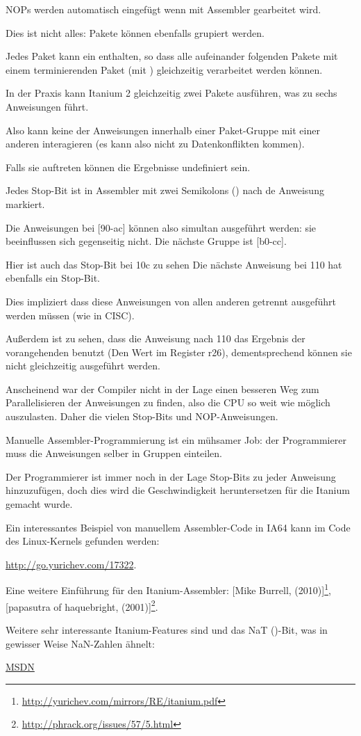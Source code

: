 \ac{NOP}s werden automatisch eingefügt wenn mit Assembler gearbeitet wird.

Dies ist nicht alles: Pakete können ebenfalls grupiert werden.

Jedes Paket kann ein   enthalten, so dass alle aufeinander folgenden
Pakete mit einem terminierenden Paket (mit ) gleichzeitig verarbeitet
werden können.

In der Praxis kann Itanium 2 gleichzeitig zwei Pakete ausführen, was zu sechs
Anweisungen führt.

Also kann keine der Anweisungen innerhalb einer Paket-Gruppe mit einer anderen
interagieren (es kann also nicht zu Datenkonflikten kommen).

Falls sie auftreten können die Ergebnisse undefiniert sein.

Jedes Stop-Bit ist in Assembler mit zwei Semikolons (\TT{;;}) nach de Anweisung markiert.

Die Anweisungen bei [90-ac] können also simultan ausgeführt werden: sie beeinflussen
sich gegenseitig nicht. Die nächste Gruppe ist [b0-cc].

Hier ist auch das Stop-Bit bei 10c zu sehen
Die nächste Anweisung bei 110 hat ebenfalls ein Stop-Bit.

Dies impliziert dass diese Anweisungen von allen anderen getrennt ausgeführt werden
müssen (wie in \ac{CISC}).

Außerdem ist zu sehen, dass die Anweisung nach 110 das Ergebnis der vorangehenden
benutzt (Den Wert im Register r26), dementsprechend können sie nicht gleichzeitig
ausgeführt werden.

Anscheinend war der Compiler nicht in der Lage einen besseren Weg zum Parallelisieren
der Anweisungen zu finden, also die \ac{CPU} so weit wie möglich auszulasten. Daher
die vielen Stop-Bits und \ac{NOP}-Anweisungen.

Manuelle Assembler-Programmierung ist ein mühsamer Job: der Programmierer muss
die Anweisungen selber in Gruppen einteilen.

Der Programmierer ist immer noch in der Lage Stop-Bits zu jeder Anweisung hinzuzufügen,
doch dies wird die Geschwindigkeit heruntersetzen für die Itanium gemacht wurde.

Ein interessantes Beispiel von manuellem Assembler-Code in \ac{IA64} kann im Code
des Linux-Kernels gefunden werden:

\url{http://go.yurichev.com/17322}.

Eine weitere Einführung für den Itanium-Assembler:
[Mike Burrell,  (2010)]\footnote{\AlsoAvailableAs \url{http://yurichev.com/mirrors/RE/itanium.pdf}},
[papasutra of haquebright,  (2001)]\footnote{\AlsoAvailableAs \url{http://phrack.org/issues/57/5.html}}.

Weitere sehr interessante Itanium-Features sind  und das
NaT ()-Bit, was in gewisser Weise \gls{NaN}-Zahlen ähnelt:

\href{http://go.yurichev.com/17323}{MSDN}
